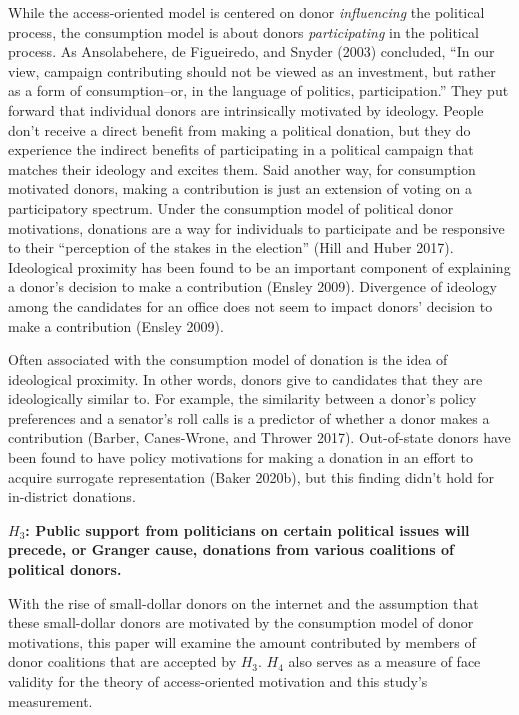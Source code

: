 \documentclass[12pt,]{article}
\begin{document}
While the access-oriented model is centered on donor \emph{influencing}
the political process, the consumption model is about donors
\emph{participating} in the political process. As Ansolabehere, de
Figueiredo, and Snyder (2003) concluded, ``In our view, campaign
contributing should not be viewed as an investment, but rather as a form
of consumption--or, in the language of politics, participation.'' They
put forward that individual donors are intrinsically motivated by
ideology. People don't receive a direct benefit from making a political
donation, but they do experience the indirect benefits of participating
in a political campaign that matches their ideology and excites them.
Said another way, for consumption motivated donors, making a
contribution is just an extension of voting on a participatory spectrum.
Under the consumption model of political donor motivations, donations
are a way for individuals to participate and be responsive to their
``perception of the stakes in the election'' (Hill and Huber 2017).
Ideological proximity has been found to be an important component of
explaining a donor's decision to make a contribution (Ensley 2009).
Divergence of ideology among the candidates for an office does not seem
to impact donors' decision to make a contribution (Ensley 2009).

Often associated with the consumption model of donation is the idea of
ideological proximity. In other words, donors give to candidates that
they are ideologically similar to. For example, the similarity between a
donor's policy preferences and a senator's roll calls is a predictor of
whether a donor makes a contribution (Barber, Canes-Wrone, and Thrower
2017). Out-of-state donors have been found to have policy motivations
for making a donation in an effort to acquire surrogate representation
(Baker 2020b), but this finding didn't hold for in-district donations.

\textbf{\(H_{3}\): Public support from politicians on certain political
issues will precede, or Granger cause, donations from various coalitions
of political donors.}

With the rise of small-dollar donors on the internet and the assumption
that these small-dollar donors are motivated by the consumption model of
donor motivations, this paper will examine the amount contributed by
members of donor coalitions that are accepted by \(H_{3}\). \(H_{4}\)
also serves as a measure of face validity for the theory of
access-oriented motivation and this study's measurement.
\end{document}
